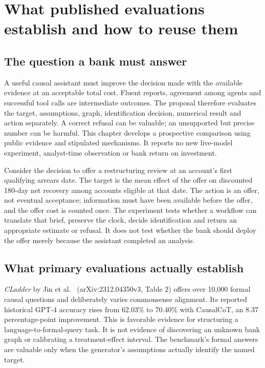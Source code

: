 \hypertarget{what-published-evaluations-establish-and-how-to-reuse-them}{%
\section{What published evaluations establish and how to reuse
them}\label{what-published-evaluations-establish-and-how-to-reuse-them}}

\label{exec14:evaluation-development}

\hypertarget{the-question-a-bank-must-answer}{%
\subsection{The question a bank must
answer}\label{the-question-a-bank-must-answer}}

A useful causal assistant must improve the decision made with the
available evidence at an acceptable total cost. Fluent reports,
agreement among agents and successful tool calls are intermediate
outcomes. The proposal therefore evaluates the target, assumptions,
graph, identification decision, numerical result and action separately.
A correct refusal can be valuable; an unsupported but precise number can
be harmful. This chapter develops a prospective comparison using public
evidence and stipulated mechanisms. It reports no new live-model
experiment, analyst-time observation or bank return on investment.

Consider the decision to offer a restructuring review at an account's
first qualifying arrears date. The target is the mean effect of the
offer on discounted 180-day net recovery among accounts eligible at that
date. The action is an offer, not eventual acceptance; information must
have been available before the offer, and the offer cost is counted
once. The experiment tests whether a workflow can translate that brief,
preserve the clock, decide identification and return an appropriate
estimate or refusal. It does not test whether the bank should deploy the
offer merely because the assistant completed an analysis.

\hypertarget{what-primary-evaluations-actually-establish}{%
\subsection{What primary evaluations actually
establish}\label{what-primary-evaluations-actually-establish}}

\emph{CLadder} by Jin et al.~\citep{v12_la_2312_04350}
(arXiv:2312.04350v3, Table 2) offers over 10,000 formal causal questions
and deliberately varies commonsense alignment. Its reported historical
GPT-4 accuracy rises from 62.03\% to 70.40\% with CausalCoT, an 8.37
percentage-point improvement. This is favorable evidence for structuring
a language-to-formal-query task. It is not evidence of discovering an
unknown bank graph or calibrating a treatment-effect interval. The
benchmark's formal answers are valuable only when the generator's
assumptions actually identify the named target.

